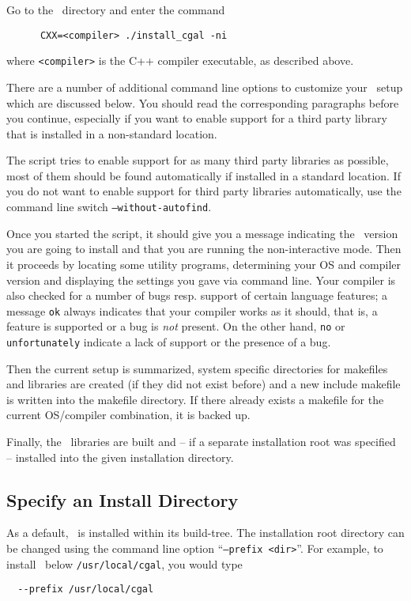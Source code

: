 Go to the \cgaldir\ directory and enter the command
\begin{verbatim}
      CXX=<compiler> ./install_cgal -ni
\end{verbatim}
where \texttt{<compiler>} is the C++ compiler executable, as described
above.

There are a number of additional command line options to customize
your \cgal\ setup which are discussed below. You should read the
corresponding paragraphs before you continue, especially if you want
to enable support for a third party library that is installed in a
non-standard location.

The script tries to enable support for as many third party libraries
as possible, most of them should be found automatically if installed
in a standard location. If you do not want to enable support for third
party libraries automatically, use the command line switch
\texttt{--without-autofind}.

Once you started the script, it should give you a message indicating
the \cgal\ version you are going to install and that you are running
the non-interactive mode. Then it proceeds by locating some utility
programs, determining your OS and compiler version and displaying the
settings you gave via command line. Your compiler is also checked for
a number of bugs resp. support of certain language features; a message
\texttt{ok} always indicates that your compiler works as it should,
that is, a feature is supported or a bug is \textit{not} present. On
the other hand, \texttt{no} or \texttt{unfortunately} indicate a lack
of support or the presence of a bug.

Then the current setup is summarized, system specific directories for
makefiles and libraries are created (if they did not exist before) and
a new include makefile is written into the makefile directory. If
there already exists a makefile for the current OS/compiler
combination, it is backed up.

Finally, the \cgal\ libraries are built and -- if a separate
installation root was specified -- installed into the given
installation directory.

\subsection{Specify an Install Directory\label{sec:install-setup}}

As a default, \cgal\ is installed within its build-tree. The
installation root directory can be changed using the command line
option ``\texttt{--prefix <dir>}''. For example, to install \cgal\
below \texttt{/usr/local/cgal}, you would type
\begin{verbatim}
  --prefix /usr/local/cgal
\end{verbatim}

